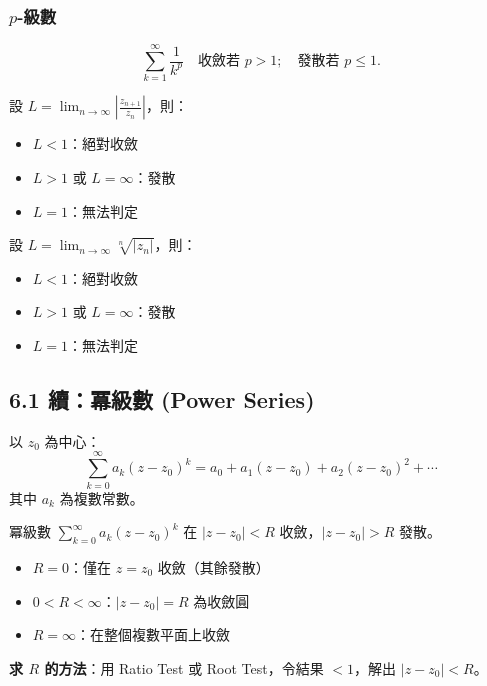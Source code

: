 \documentclass[12pt,a4paper]{article}
\begin{document}
\subsubsection*{$p$-級數}
$$\sum_{k=1}^{\infty}\frac{1}{k^p}\quad\text{收斂若 }p>1;\quad \text{發散若 }p\le 1.$$

\begin{theorembox}
設 $\displaystyle L=\lim_{n\to\infty}\left|\frac{z_{n+1}}{z_n}\right|$，則：
\begin{itemize}[nosep]
\item $L<1$：絕對收斂
\item $L>1$ 或 $L=\infty$：發散
\item $L=1$：無法判定
\end{itemize}
\end{theorembox}

\begin{theorembox}
設 $\displaystyle L=\lim_{n\to\infty}\sqrt[n]{|z_n|}$，則：
\begin{itemize}[nosep]
\item $L<1$：絕對收斂
\item $L>1$ 或 $L=\infty$：發散
\item $L=1$：無法判定
\end{itemize}
\end{theorembox}

\subsection{6.1 續：冪級數 (Power Series)}

\begin{defbox}[冪級數]
以 $z_0$ 為中心：
$$\sum_{k=0}^{\infty}a_k(z-z_0)^k = a_0+a_1(z-z_0)+a_2(z-z_0)^2+\cdots$$
其中 $a_k$ 為複數常數。
\end{defbox}

\begin{keybox}[收斂半徑 $R$]
冪級數 $\displaystyle\sum_{k=0}^{\infty}a_k(z-z_0)^k$ 在 $|z-z_0|<R$ 收斂，$|z-z_0|>R$ 發散。
\begin{itemize}[nosep]
\item $R=0$：僅在 $z=z_0$ 收斂（其餘發散）
\item $0<R<\infty$：$|z-z_0|=R$ 為收斂圓
\item $R=\infty$：在整個複數平面上收斂
\end{itemize}

\textbf{求 $R$ 的方法}：用 Ratio Test 或 Root Test，令結果 $<1$，解出 $|z-z_0|<R$。
\end{keybox}
\end{document}
